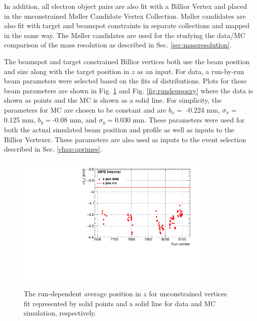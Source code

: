 In addition, all electron object pairs are also fit with a Billior Vertex and placed in the unconstrained M\o ller Candidate Vertex Collection. M\o ller candidates are also fit with target and beamspot constraints in separate collections and mapped in the same way. The M\o ller candidates are used for the studying the data/MC comparison of the mass resolution as described in Sec. \ref{sec:massresolution}.

The beamspot and target constrained Billior vertices both use the beam position and size along with the target position in $z$ as an input. For data, a run-by-run beam parameters were selected based on the fits of distributions. Plots for these beam parameters are shown in Fig. \ref{fig:rundepposz} and Fig. \ref{fig:rundepposxy} where the data is shown as points and the MC is shown as a solid line. For simplicity, the parameters for MC are chosen to be constant and are $b_x=$ -0.224 mm, $\sigma_x=$0.125 mm, $b_y=$-0.08 mm, and $\sigma_y=$0.030 mm. These parameters were used for both the actual simulated beam position and profile as well as inputs to the Billior Vertexer. These parameters are also used as inputs to the event selection described in Sec. \ref{chap:aprimes}.

\begin{figure}[t!]
    \centering
    \includegraphics[width=0.85\textwidth]{figs/recon/z_final.pdf}
    \caption{The run-dependent average position in $z$ for unconstrained vertices fit represented by solid points and a solid line for data and MC simulation, respectively.}
    \label{fig:rundepposz}
\end{figure}

